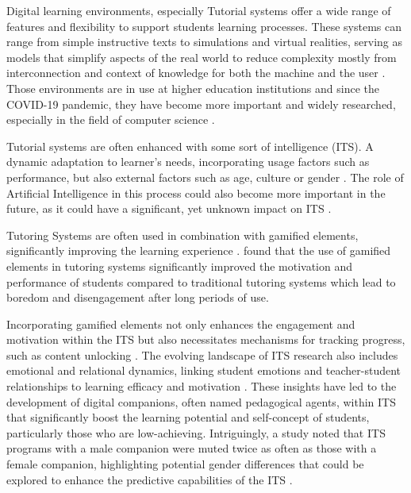 
Digital learning environments, especially Tutorial systems offer a wide range of features and flexibility to support students learning processes.
These systems can range from simple instructive texts to simulations and virtual realities, serving as models that simplify aspects of the real world to reduce complexity mostly from interconnection and context of knowledge for both the machine and the user \parencite{psotkaIntelligentTutoringSystems1988}.
Those environments are in use at higher education institutions and since the COVID-19 pandemic, they have become more important \parencite{elhadbiReviewStudyAdaptive2024} and widely researched, especially in the field of computer science \parencite{zawacki-richterSystematicReviewResearch2019}.

Tutorial systems are often enhanced with some sort of intelligence (ITS). A dynamic adaptation to learner's needs, incorporating usage factors such as performance, but also external factors such as age, culture or gender \parencite{nkambouAdvancesIntelligentTutoring2010, gonzalezGamificationIntelligentTutoring2014}.
The role of Artificial Intelligence in this process could also become more important in the future, as it could have a significant, yet unknown impact on ITS \parencite{zawacki-richterSystematicReviewResearch2019}.

Tutoring Systems are often used in combination with gamified elements, significantly improving the learning experience \parencite{dermevalGaTOOntologicalModel2019}.
\textcite{jacksonMotivationPerformanceGamebased2013} found that the use of gamified elements in tutoring systems significantly improved the motivation and performance of students compared to traditional tutoring systems which lead to boredom and disengagement after long periods of use.

Incorporating gamified elements not only enhances the engagement and motivation within the ITS but also necessitates mechanisms for tracking progress, such as content unlocking \parencite{gonzalezGamificationIntelligentTutoring2014}.
The evolving landscape of ITS research also includes emotional and relational dynamics, linking student emotions and teacher-student relationships to learning efficacy and motivation \parencite{woolfAffectiveTutorsAutomatic2010}.
These insights have led to the development of digital companions, often named pedagogical agents, within ITS that significantly boost the learning potential and self-concept of students, particularly those who are low-achieving.
Intriguingly, a study noted that ITS programs with a male companion were muted twice as often as those with a female companion, highlighting potential gender differences that could be explored to enhance the predictive capabilities of the ITS \parencite{woolfAffectiveTutorsAutomatic2010}.

